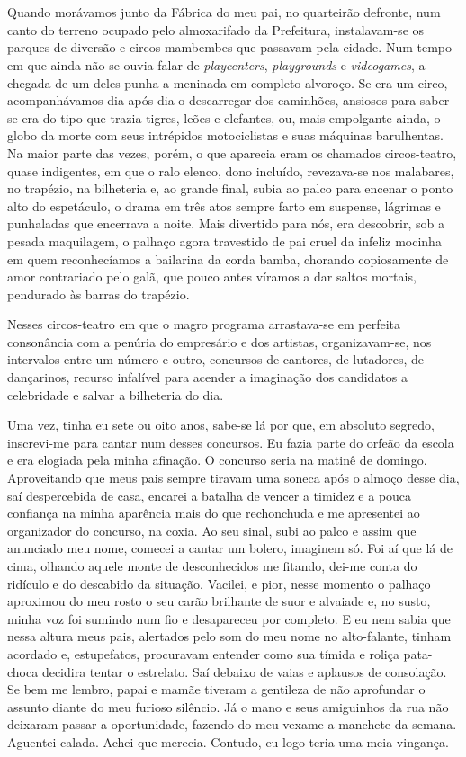 \chapter{}
Quando morávamos junto da Fábrica do meu pai, no quarteirão defronte, num canto do terreno ocupado pelo almoxarifado da Prefeitura, instalavam-se os parques de diversão e circos mambembes que passavam pela cidade.
Num tempo em que ainda não se ouvia falar de \textit{playcenters}, \textit{playgrounds} e \textit{videogames}, a chegada de um deles punha a meninada em completo alvoroço.
Se era um circo, acompanhávamos dia após dia o descarregar dos caminhões, ansiosos para saber se era do tipo que trazia tigres, leões e elefantes, ou, mais empolgante ainda, o globo da morte com seus intrépidos motociclistas e suas máquinas barulhentas.
Na maior parte das vezes, porém, o que aparecia eram os chamados circos-teatro, quase indigentes, em que o ralo elenco, dono incluído, revezava-se nos malabares, no trapézio, na bilheteria e, ao grande final, subia ao palco para encenar o ponto alto do espetáculo, o drama em três atos sempre farto em suspense, lágrimas e punhaladas que encerrava a noite.
Mais divertido para nós, era descobrir, sob a pesada maquilagem, o palhaço agora travestido de pai cruel da infeliz mocinha em quem reconhecíamos a bailarina da corda bamba, chorando copiosamente de amor contrariado pelo galã, que pouco antes víramos a dar saltos mortais, pendurado às barras do trapézio.

Nesses circos-teatro em que o magro programa arrastava-se em perfeita consonância com a penúria do empresário e dos artistas, organizavam-se, nos intervalos entre um número e outro, concursos de cantores, de lutadores, de dançarinos, recurso infalível para acender a imaginação dos candidatos a celebridade e salvar a bilheteria do dia.

Uma vez, tinha eu sete ou oito anos, sabe-se lá por que, em absoluto segredo, inscrevi-me para cantar num desses concursos.
Eu fazia parte do orfeão da escola e era elogiada pela minha afinação.
O concurso seria na matinê de domingo.
Aproveitando que meus pais sempre tiravam uma soneca após o almoço desse dia, saí despercebida de casa, encarei a batalha de vencer a timidez e a pouca confiança na minha aparência mais do que rechonchuda e me apresentei ao organizador do concurso, na coxia.
Ao seu sinal, subi ao palco e assim que anunciado meu nome, comecei a cantar um bolero, imaginem só.
Foi aí que lá de cima, olhando aquele monte de desconhecidos me fitando, dei-me conta do ridículo e do descabido da situação.
Vacilei, e pior, nesse momento o palhaço aproximou do meu rosto o seu carão brilhante de suor e alvaiade e, no susto, minha voz foi sumindo num fio e desapareceu por completo.
E eu nem sabia que nessa altura meus pais, alertados pelo som do meu nome no alto-falante, tinham acordado e, estupefatos, procuravam entender como sua tímida e roliça pata-choca decidira tentar o estrelato.
Saí debaixo de vaias e aplausos de consolação.
Se bem me lembro, papai e mamãe tiveram a gentileza de não aprofundar o assunto diante do meu furioso silêncio.
Já o mano e seus amiguinhos da rua não deixaram passar a oportunidade, fazendo do meu vexame a manchete da semana.
Aguentei calada.
Achei que merecia.
Contudo, eu logo teria uma meia vingança.

